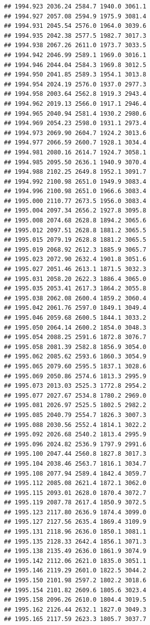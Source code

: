 \documentclass[
]{book}
\begin{document}
\begin{verbatim}
## 1994.923 2036.24 2584.7 1940.0 3061.1
## 1994.927 2057.08 2594.9 1975.9 3081.4
## 1994.931 2045.54 2576.0 1964.0 3039.6
## 1994.935 2042.38 2577.5 1982.7 3017.3
## 1994.938 2067.26 2611.0 1973.7 3033.5
## 1994.942 2046.99 2589.1 1969.0 3016.1
## 1994.946 2044.04 2584.3 1969.8 3012.5
## 1994.950 2041.85 2589.3 1954.1 3013.8
## 1994.954 2024.19 2576.0 1937.0 2977.3
## 1994.958 2003.64 2562.8 1919.3 2943.4
## 1994.962 2019.13 2566.0 1917.1 2946.4
## 1994.965 2040.94 2581.4 1930.2 2980.6
## 1994.969 2054.23 2598.0 1931.1 2973.4
## 1994.973 2069.90 2604.7 1924.2 3013.6
## 1994.977 2066.59 2600.7 1928.1 3034.4
## 1994.981 2080.16 2614.7 1924.7 3058.1
## 1994.985 2095.50 2636.1 1940.9 3070.4
## 1994.988 2102.25 2649.8 1952.1 3091.7
## 1994.992 2100.98 2651.0 1949.9 3083.4
## 1994.996 2100.98 2651.0 1966.6 3083.4
## 1995.000 2110.77 2673.5 1956.0 3083.4
## 1995.004 2097.34 2656.2 1927.8 3095.8
## 1995.008 2074.68 2628.8 1894.2 3065.6
## 1995.012 2097.51 2628.8 1881.2 3065.5
## 1995.015 2079.19 2628.8 1881.2 3065.5
## 1995.019 2068.92 2612.3 1885.9 3065.7
## 1995.023 2072.90 2632.4 1901.8 3051.6
## 1995.027 2051.46 2613.1 1871.5 3032.3
## 1995.031 2058.20 2622.3 1886.4 3065.0
## 1995.035 2053.41 2617.3 1864.2 3055.8
## 1995.038 2062.08 2600.4 1859.2 3060.4
## 1995.042 2061.76 2597.0 1849.1 3049.4
## 1995.046 2059.68 2600.5 1844.1 3033.2
## 1995.050 2064.14 2600.2 1854.0 3048.3
## 1995.054 2088.25 2591.6 1872.8 3076.7
## 1995.058 2081.39 2582.8 1856.9 3054.0
## 1995.062 2085.62 2593.6 1860.3 3054.9
## 1995.065 2079.60 2595.5 1837.1 3028.6
## 1995.069 2050.86 2574.6 1813.3 2995.9
## 1995.073 2013.03 2525.3 1772.8 2954.2
## 1995.077 2027.67 2534.8 1780.2 2969.0
## 1995.081 2026.97 2525.5 1802.5 2982.2
## 1995.085 2040.79 2554.7 1826.3 3007.3
## 1995.088 2030.56 2552.4 1814.1 3022.2
## 1995.092 2026.68 2540.2 1813.4 2995.9
## 1995.096 2024.82 2536.9 1797.9 2991.6
## 1995.100 2047.44 2560.8 1827.8 3017.3
## 1995.104 2038.46 2563.7 1816.1 3034.7
## 1995.108 2077.94 2589.4 1842.4 3059.7
## 1995.112 2085.08 2621.4 1872.1 3062.0
## 1995.115 2093.01 2628.0 1870.4 3072.7
## 1995.119 2087.78 2617.4 1850.9 3072.5
## 1995.123 2117.80 2636.9 1874.4 3099.0
## 1995.127 2127.56 2635.4 1869.4 3109.9
## 1995.131 2118.96 2636.0 1850.1 3081.1
## 1995.135 2128.33 2642.4 1856.1 3071.3
## 1995.138 2135.49 2636.0 1861.9 3074.9
## 1995.142 2112.06 2621.0 1835.0 3051.1
## 1995.146 2119.29 2601.0 1822.5 3044.2
## 1995.150 2101.98 2597.2 1802.2 3018.6
## 1995.154 2101.82 2609.6 1805.6 3023.4
## 1995.158 2096.26 2610.0 1804.4 3019.5
## 1995.162 2126.44 2632.1 1827.0 3049.3
## 1995.165 2117.59 2623.3 1805.7 3037.7

\end{verbatim}
\end{document}
